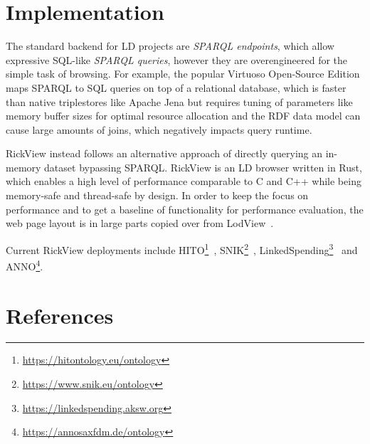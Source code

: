 \documentclass[a4paper]{article}
\begin{document}
\section{Implementation}\label{implementation}

The standard backend for LD projects are \emph{SPARQL endpoints}, which allow expressive SQL-like \emph{SPARQL queries}, however they are overengineered for the simple task of browsing.
For example, the popular Virtuoso Open-Source Edition maps SPARQL to SQL queries on top of a relational database, which is faster than native triplestores like Apache Jena but requires tuning of parameters like memory buffer sizes for optimal resource allocation and the RDF data model can cause large amounts of joins, which negatively impacts query runtime.

RickView instead follows an alternative approach of directly querying an in-memory dataset bypassing SPARQL.
RickView is an LD browser written in Rust, which enables a high level of performance comparable to C and C++ while being memory-safe and thread-safe by design.
In order to keep the focus on performance and to get a baseline of functionality for performance evaluation, the web page layout is in large parts copied
over from LodView~\citep{lodview,adaptinglodview}.

Current RickView deployments include HITO\footnote{\url{https://hitontology.eu/ontology}}~\citep{hito}, SNIK\footnote{\url{https://www.snik.eu/ontology}}~\citep{snik},
LinkedSpending\footnote{\url{https://linkedspending.aksw.org}}~\citep{linkedspending} and ANNO\footnote{\url{https://annosaxfdm.de/ontology}}.

\section{References}\label{references}



\end{document}
